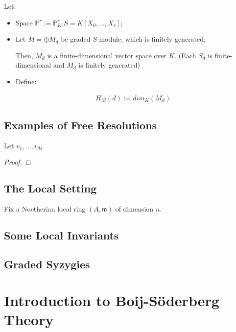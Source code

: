 \documentclass[Total.tex]{subfiles}
\begin{document}
		\begin{Def}
			Let:
			
			\begin{itemize}
				\item Space $\mathbb{P}^r:=\mathbb{P}^r_K$,$S=K[X_0,\dots,X_r]$;
				\item Let $M=\oplus M_d$ be graded $S$-module, which is finitely generated;
				
				Then, $M_d$ is a finite-dimensional vector space over $K$. (Each $S_d$ is finite-dimensional and $M_d$ is finitely generated)
				
				\item Define:
				
				\begin{gather*}
					H_M(d):=dim_K(M_d)
				\end{gather*}
			\end{itemize}
		\end{Def}
		\section{Examples of Free Resolutions}
			
			
			\begin{theorem}
				Let $v_1,\dots,v_{ds}$
			\end{theorem}
			
			\begin{proof}
				
			\end{proof}
		\section{The Local Setting}
		
			{\LARGE F}ix a Noetherian local ring $(A,\mathfrak{m})$ of dimension $n$.   
		\section{Some Local Invariants}
		\section{Graded Syzygies}
	\chapter{Introduction to Boij-Söderberg Theory}
	
	
	
\end{document}

